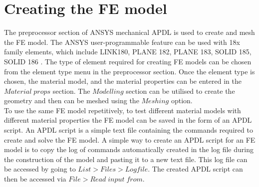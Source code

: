 \documentclass[12pt,a4paper,twoside,openright]{report}
\begin{document}
\section{Creating the FE model}
\indent\indent\indent  The preprocessor section of ANSYS mechanical APDL is used to create and mesh the FE model. The ANSYS user-programmable feature can be used with 18x family elements, which include LINK180, PLANE 182, PLANE 183, SOLID 185, SOLID 186 \citep{lin1999ansys}. The type of element required for creating FE models can be chosen from the element type menu in the preprocessor section. Once the element type is chosen, the material model, and the material properties can be entered in the $Material\; props$ section.  The $Modelling$ section can be utilised to create the geometry and then can be meshed using the $Meshing$ option.\\ \indent\indent\indent To use the same FE model repetitively, to test different material models with different material properties the FE model can be saved in the form of an APDL script.  An APDL script is a simple text file containing the commands required to create and solve the FE model. A simple way to create an APDL script for an FE model is to copy the log of commands automatically created in the log file during the construction of the model and pasting it to a new text file. This log file can be accessed by going to $List>Files>Logfile$. The created APDL script can then be accessed via $File>Read \;input\; from$.
\end{document}
